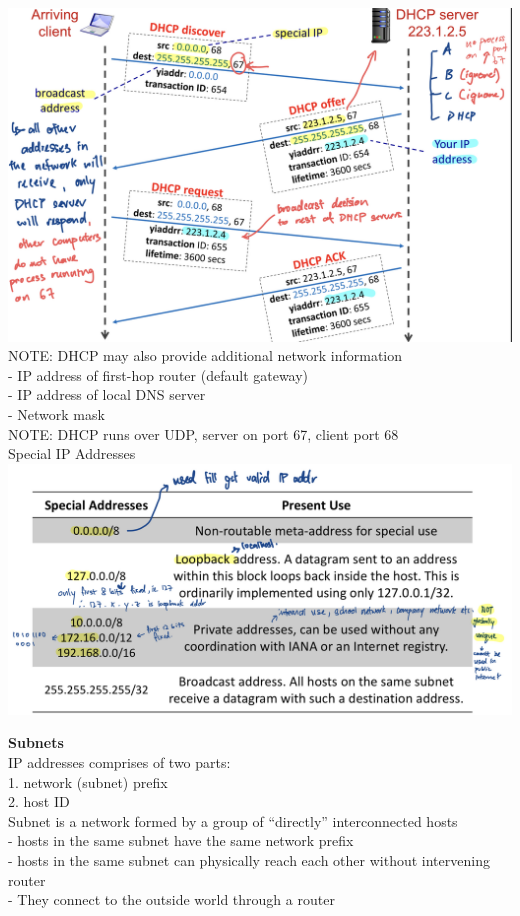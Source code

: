 \documentclass[10pt, a4paper]{article}
\newcommand{\blue}[1]{{\color{MidnightBlue}#1}}
\newcommand{\red}[1]{{\color{red}#1}}
\begin{document}
\begin{multicols*}{3}
		\includegraphics[scale=.15]{./assets/dhcp}
		\red{NOTE:} DHCP may also provide additional network information\\
		- IP address of \blue{first-hop router} (default gateway)\\
		- IP address of \blue{local DNS server}\\
		- \blue{Network mask}\\
		\red{NOTE:} DHCP runs over UDP, server on port 67, client port 68\\

		Special IP Addresses\\
		\includegraphics[scale=.16]{./assets/specialIpAddr}

		\textbf{Subnets}\\
		IP addresses comprises of two parts:\\
		1. network (subnet) prefix\\
		2. host ID\\
		\red{Subnet} is a network formed by a group of ``directly'' interconnected hosts\\
		- hosts in the same subnet have the same network prefix\\
		- hosts in the same subnet can physically reach each other \blue{without intervening router}\\
		- They connect to the outside world through a router\\


\end{multicols*}
\end{document}

